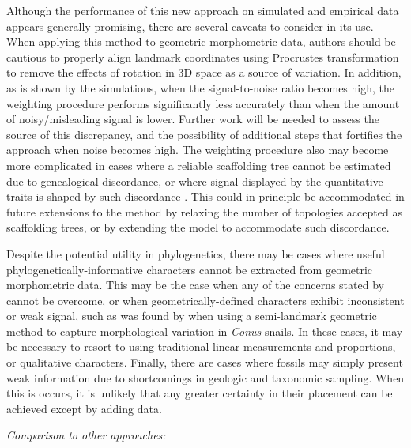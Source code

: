 \documentclass[12pt]{article}
\begin{document}
Although the performance of this new approach on simulated and empirical data appears
generally promising, there are several caveats to consider in its use. When applying this
method to geometric morphometric data, authors should be cautious to properly align landmark 
coordinates using Procrustes transformation to remove the effects of rotation in 3D space as a source of
variation. In addition, as is shown by the simulations, when the signal-to-noise ratio becomes high, the 
weighting procedure performs significantly less accurately than when the amount of noisy/misleading
signal is lower. Further work will be needed to assess the source of this discrepancy, and the possibility
of additional steps that fortifies the approach when noise becomes high. The weighting procedure also
may become more complicated in cases where a reliable scaffolding tree cannot be estimated due to genealogical
discordance, or where signal displayed by the quantitative traits is shaped by such discordance \citep{mendes2018evolutionary}.
This could in principle be accommodated in future extensions to the method by relaxing the number of topologies 
accepted as scaffolding trees, or by extending the model to accommodate such discordance.

Despite the potential utility in phylogenetics, there may be cases where
useful phylogenetically-informative characters cannot be extracted from 
geometric morphometric data. This may be the case when any of the concerns
stated by \cite{felsenstein2002quantitative} cannot be overcome, or when 
geometrically-defined characters exhibit inconsistent or weak signal, such as was 
found by \cite{smith2013geometric} when using a semi-landmark geometric method
to capture morphological variation in \emph{Conus} snails. In these cases, it may 
be necessary to resort to using traditional linear measurements and proportions, 
or qualitative characters.  Finally, there are cases where fossils may simply present weak information
due to shortcomings in geologic and taxonomic sampling. When this is
occurs, it is unlikely that any greater certainty in their placement can
be achieved except by adding data. 

\noindent\emph{Comparison to other approaches:}
\end{document}
